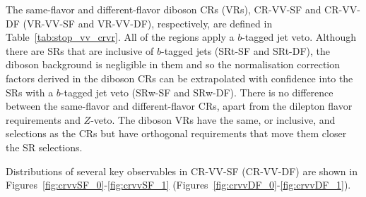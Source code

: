 The same-flavor and different-flavor diboson CRs (VRs), CR-VV-SF and CR-VV-DF (VR-VV-SF and VR-VV-DF), respectively,
are defined in Table~\ref{tab:stop_vv_crvr}.
All of the regions apply a $b$-tagged jet veto.
Although there are SRs that are inclusive of $b$-tagged jets (SRt-SF and SRt-DF), the diboson background
is negligible in them and so the normalisation correction factors derived in the diboson CRs
can be extrapolated with confidence into the SRs with a $b$-tagged jet veto (SRw-SF and SRw-DF).
There is no difference between the same-flavor and different-flavor CRs, apart from the dilepton flavor
requirements and $Z$-veto.
The diboson VRs have the same, or inclusive, \rpt and \gaminv  selections as the CRs but have orthogonal
\mdr requirements that move them closer the SR selections.

Distributions of several key observables in CR-VV-SF (CR-VV-DF) are shown in Figures~\ref{fig:crvvSF_0}-\ref{fig:crvvSF_1}
(Figures~\ref{fig:crvvDF_0}-\ref{fig:crvvDF_1}).

{\color{red}{VR-VV DISTRIBUTIONS IN APPENDIX??}}

